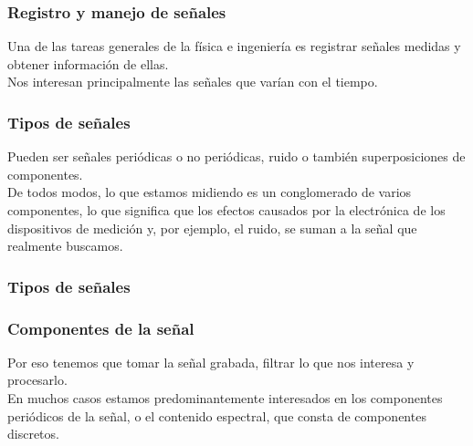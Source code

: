 \documentclass[12pt]{beamer}
\begin{document}
\begin{frame}
\frametitle{Registro y manejo de señales}
Una de las tareas generales de la física e ingeniería es registrar señales medidas y obtener información de ellas.
\\
\bigskip
\pause
Nos interesan principalmente las señales que varían con el tiempo.
\end{frame}
\begin{frame}
\frametitle{Tipos de señales}
Pueden ser señales periódicas o no periódicas, ruido o también superposiciones de componentes.
\\
\bigskip
\pause
De todos modos, lo que estamos midiendo es un conglomerado de varios componentes, lo que significa que los efectos causados por la electrónica de los dispositivos de medición y, por ejemplo, el ruido, se suman a la señal que realmente buscamos.
\end{frame}
\begin{frame}
\frametitle{Tipos de señales}
\begin{figure}
    \centering
\end{figure}
\end{frame}
\begin{frame}
\frametitle{Componentes de la señal}
Por eso tenemos que tomar la señal grabada, filtrar lo que nos interesa y procesarlo.
\\
\bigskip
\pause
En muchos casos estamos predominantemente interesados en los componentes periódicos de la señal, o el contenido espectral, que consta de componentes discretos.
\end{frame}
\end{document}

